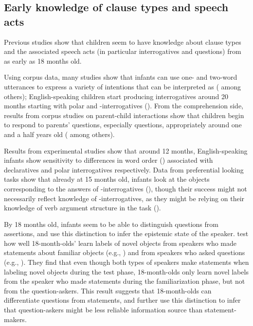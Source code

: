 \subsection{Early knowledge of clause types and speech acts} \label{sec:bg:acq:spcl}

Previous studies show that children seem to have knowledge about clause types and the associated speech acts (in particular interrogatives and questions) from as early as 18 months old. 

Using corpus data, many studies show that infants can use one- and two-word utterances to express a variety of intentions that can be interpreted as \aqrs{} (\cite{bateson1975,bates1976language,ninio1994} among others); English-speaking children start producing interrogatives around 20 months starting with polar and \twh-interrogatives (\citealt{tyack1977, stromswold1995, rowland2003cdswh}). From the comprehension side, results from corpus studies on parent-child interactions show that children begin to respond to parents’ questions, especially  questions, appropriately around one and a half years old (\citealt{ervintripp1978, steffensen1978, shatz1978comprehension, shatz1978communicative, berningergarvey1981, shatzmccloskey1984, clark2015turn, moradlou2020} among others). 






Results from experimental studies show that around 12 months, English-speaking infants show sensitivity to differences in word order (\citealt{geffenmintz2015wordorder}) associated with declaratives and polar interrogatives respectively. Data from preferential looking tasks show that already at 15 months old, infants look at the objects corresponding to the answers of \twh-interrogatives (\citealt{seidl2003wh, gagliardi2016wh, perkins2020filler}), though their success might not necessarily reflect knowledge of \twh-interrogatives, as they might be relying on their knowledge of verb argument structure in the task (\citealt{perkins2019}). 

By 18 months old, infants seem to be able to distinguish questions from assertions, and use this distinction to infer the epistemic state of the speaker. \textcite{luchkina2018infant} test how well 18-month-olds’ learn labels of novel objects from speakers who made statements about familiar objects (e.g., ) and from speakers who asked questions (e.g., ). They find that even though both types of speakers make statements when labeling novel objects during the test phase, 18-month-olds only learn novel labels from the speaker who made statements during the familiarization phase, but not from the question-askers. This result suggests that 18-month-olds can differentiate questions from statements, and further use this distinction to infer that question-askers might be less reliable information source than statement-makers. 

